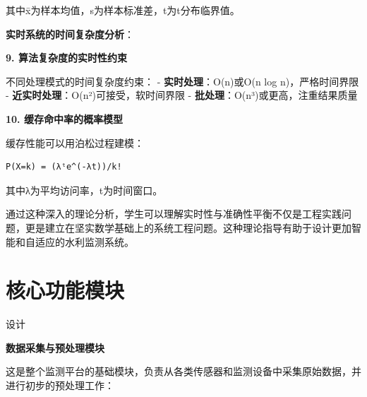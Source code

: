 其中x̄为样本均值，s为样本标准差，t为t分布临界值。

\textbf{实时系统的时间复杂度分析}：

\textbf{9. 算法复杂度的实时性约束}

不同处理模式的时间复杂度约束： - \textbf{实时处理}：O(n)或O(n log n)，严格时间界限 - \textbf{近实时处理}：O(n²)可接受，软时间界限 - \textbf{批处理}：O(n³)或更高，注重结果质量

\textbf{10. 缓存命中率的概率模型}

缓存性能可以用泊松过程建模：

\begin{lstlisting}
P(X=k) = (λᵗe^(-λt))/k!
\end{lstlisting}

其中λ为平均访问率，t为时间窗口。

通过这种深入的理论分析，学生可以理解实时性与准确性平衡不仅是工程实践问题，更是建立在坚实数学基础上的系统工程问题。这种理论指导有助于设计更加智能和自适应的水利监测系统。


\section{核心功能模块}

设计

\textbf{数据采集与预处理模块}

这是整个监测平台的基础模块，负责从各类传感器和监测设备中采集原始数据，并进行初步的预处理工作：

